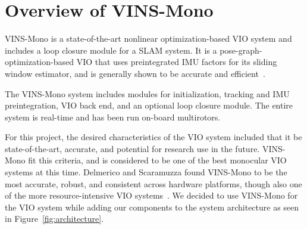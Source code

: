
\section{Overview of VINS-Mono}\label{sec:vinsmono}

VINS-Mono is a state-of-the-art nonlinear optimization-based VIO system and includes a loop closure module for a SLAM system.
It is a pose-graph-optimization-based VIO that uses preintegrated IMU factors for its sliding window estimator, and is generally shown to be accurate and efficient~\cite{Delmerico2018}.

The VINS-Mono system includes modules for initialization, tracking and IMU preintegration, VIO back end, and an optional loop closure module.
The entire system is real-time and has been run on-board multirotors.

For this project, the desired characteristics of the VIO system included that it be state-of-the-art, accurate, and potential for research use in the future.
VINS-Mono fit this criteria, and is considered to be one of the best monocular VIO systems at this time.
Delmerico and Scaramuzza found VINS-Mono to be the most accurate, robust, and consistent across hardware platforms, though also one of the more resource-intensive VIO systems~\cite{Delmerico2018}.
We decided to use VINS-Mono for the VIO system while adding our components to the system architecture as seen in Figure~\ref{fig:architecture}.
